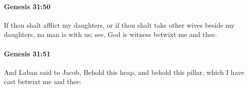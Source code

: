 		\paragraph{Genesis 31:50} %
			\label{GENESIS-31-50}

			If thou shalt afflict my daughters, or if thou shalt take other wives beside my daughters, no man is with us; see, God is witness betwixt me and thee.


		\paragraph{Genesis 31:51} %
			\label{GENESIS-31-51}

			And Laban said to Jacob, Behold this heap, and behold this pillar, which I have cast betwixt me and thee:


